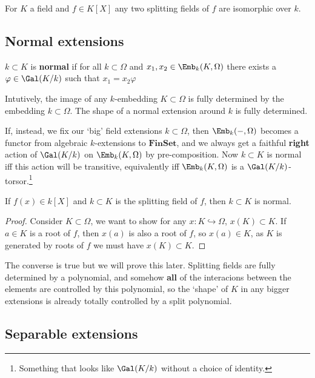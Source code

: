 \documentclass{article}
\begin{document}
\begin{corollary}
    For $K$ a field and $f\in K[X]$ any two splitting fields of $f$ are isomorphic over $k$.
\end{corollary}

\subsection{Normal extensions}

\begin{definition}
    $k\subset K$ is \textbf{normal} if for all $k\subset \Omega$ and $x_1,x_2\in\Emb_k(K,\Omega)$ there exists a $\varphi \in \Gal(K/k)$ such that $x_1=x_2\varphi$
\end{definition}

Intutively, the image of any $k$-embedding $K\subset \Omega$ is fully determined by the embedding $k\subset \Omega$. The shape of a normal extension around $k$ is fully determined.

If, instead, we fix our `big' field extensions $k\subset \Omega$, then $\Emb_k(-,\Omega)$ becomes a functor from algebraic $k$-extensions to $\textbf{FinSet}$, and we always get a faithful \textbf{right} action of $\Gal(K/k)$ on $\Emb_k(K,\Omega)$ by pre-composition. Now $k\subset K$ is normal iff this action will be transitive, equivalently iff $\Emb_k(K,\Omega)$ is a $\Gal(K/k)$-torsor.\footnote{Something that looks like $\Gal(K/k)$ without a choice of identity.}

\begin{proposition}
    If $f(x)\in k[X]$ and $k\subset K$ is the splitting field of $f$, then $k\subset K$ is normal.
    \begin{proof}
        Consider $K\subset\Omega$, we want to show for any $x:K\hookrightarrow \Omega$, $x(K)\subset K$. If $a\in K$ is a root of $f$, then $x(a)$ is also a root of $f$, so $x(a)\in K$, as $K$ is generated by roots of $f$ we must have $x(K)\subset K$.
    \end{proof}
\end{proposition}

The converse is true but we will prove this later. Splitting fields are fully determined by a polynomial, and somehow \textbf{all} of the interacions between the elements are controlled by this polynomial, so the `shape' of $K$ in any bigger extensions is already totally controlled by a split polynomial.

\subsection{Separable extensions}
\end{document}
